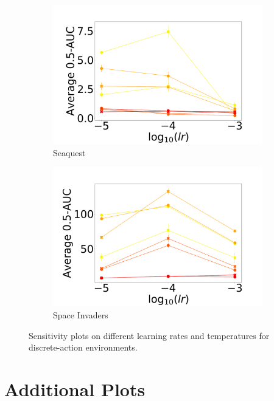 \documentclass{article}
\begin{document}
\begin{figure}[!ht]
\begin{subfigure}[b]{0.25\linewidth}
    \includegraphics[width=\columnwidth]{figs/deep/discrete/sensitivity/UNLABELED_kl_auc-0.5_seaquest_lr_sensitivity.png} 
    \caption{Seaquest
    }\label{fig:seaquest}
  \end{subfigure}%
  \begin{subfigure}[b]{0.25\linewidth}
    \centering
    \includegraphics[width=\columnwidth]{figs/deep/discrete/sensitivity/UNLABELED_kl_auc-0.5_space_invaders_lr_sensitivity.png} 
    \caption{Space Invaders
    }\label{fig:space-invaders}
  \end{subfigure}
  \caption{Sensitivity plots on different learning rates and temperatures for discrete-action environments.}
\end{figure}


\clearpage

\section{Additional Plots}\label{sec:more-plots}
\end{document}

